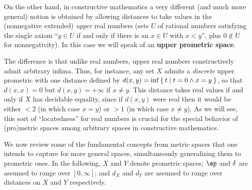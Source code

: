 \documentclass{article}
\def\Rp{[0,\infty]}
\begin{document}
On the other hand, in constructive mathematics a very different (and much more general) notion is obtained by allowing distances to take values in the (nonnegative extended) \emph{upper} real numbers (sets $U$ of rational numbers satisfying the single axiom ``$y\in U$ if and only if there is an $x\in U$ with $x<y$'', plus $0\notin U$ for nonnegativity).
In this case we will speak of an \textbf{upper prometric space}.

The difference is that unlike real numbers, upper real numbers constructively admit arbitrary infima.
Thus, for instance, any set $X$ admits a \emph{discrete} upper prometric with one distance defined by $d(x,y) = \inf \Set{ t | t=0 \land x=y }$, so that $d(x,x)=0$ but $d(x,y)=+\infty$ if $x\neq y$.
This distance takes real values if and only if $X$ has decidable equality, since if $d(x,y)$ were real then it would be either $<2$ (in which case $x=y$) or $>1$ (in which case $x\neq y$).
As we will see, this sort of ``locatedness'' for real numbers is crucial for the special behavior of (pro)metric spaces among arbitrary spaces in constructive mathematics.

We now review some of the fundamental concepts from metric spaces that one intends to capture for more general spaces, simultaneously generalizing them to prometric ones.
In the following, $X$ and $Y$ denote prometric spaces; $\ep$ and $\delta$ are assumed to range over $\Rp$; and $d_X$ and $d_Y$ are assumed to range over distances on $X$ and $Y$ respectively.
\end{document}
